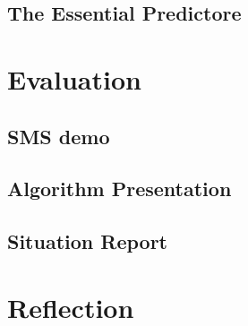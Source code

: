 \subsection{The Essential Predictore}
\section{Evaluation}
\subsection{SMS demo}
\subsection{Algorithm Presentation}
\subsection{Situation Report}
\section{Reflection}
